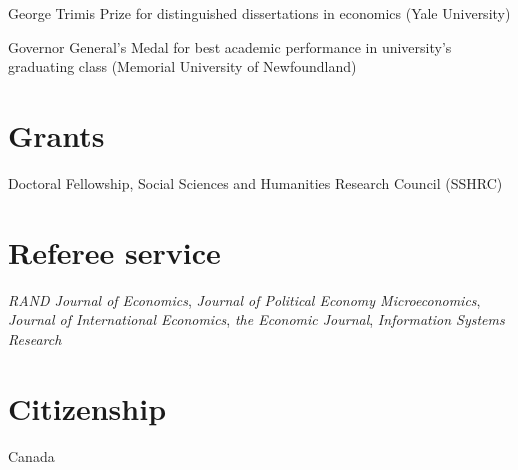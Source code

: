 \documentclass[11pt]{article} %
\begin{document}
 George Trimis Prize for distinguished dissertations in economics (Yale University)

 Governor General's Medal for best academic performance in university's graduating class
	(Memorial University of Newfoundland)

\section*{Grants}


Doctoral Fellowship, Social Sciences and Humanities Research Council (SSHRC)


\section*{Referee service}

\textit{RAND Journal of Economics}, \textit{Journal of Political Economy Microeconomics},
\textit{Journal of International Economics}, \textit{the Economic Journal},
\textit{Information Systems Research}

%
%
%


\section*{Citizenship}

Canada

%
%



\vfill %
\end{document}
